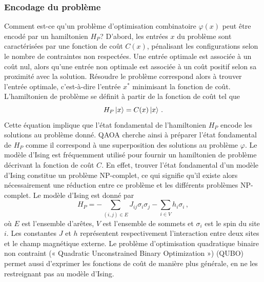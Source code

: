 
\subsubsection{Encodage du problème}
\label{subsec:encodage-probleme}

Comment est-ce qu'un problème d'optimisation combinatoire $\varphi(x)$ peut être encodé par un hamiltonien $H_{P}$? D'abord, les entrées $x$ du problème sont caractérisées par une fonction de coût $C(x)$, pénalisant les configurations selon le nombre de contraintes non respectées. Une entrée optimale est associée à un coût nul, alors qu'une entrée non optimale est associée à un coût positif selon sa proximité avec la solution. Résoudre le problème correspond alors à trouver l'entrée optimale, c'est-à-dire l'entrée $x^{*}$ minimisant la fonction de coût. L'hamiltonien de problème se définit à partir de la fonction de coût tel que
\begin{equation}
    H_{P} \ket{x} = C(x) \ket{x} \,.
\end{equation}
Cette équation implique que l'état fondamental de l'hamiltonien $H_{P}$ encode les solutions au problème donné. QAOA cherche ainsi à préparer l'état fondamental de $H_{P}$ comme il correspond à une superposition des solutions au problème $\varphi$. Le modèle d'Ising est fréquemment utilisé pour fournir un hamiltonien de problème décrivant la fonction de coût $C$. En effet, trouver l'état fondamental d'un modèle d'Ising constitue un problème \textsf{NP}-complet, ce qui signifie qu'il existe alors nécessairement une réduction entre ce problème et les différents problèmes \textsf{NP}-complet. Le modèle d'Ising est donné par
\begin{equation}
    \label{eq:hamiltonien-ising}
    H_P = - \sum_{(i,j) \in E} J_{ij} \sigma_i \sigma_j - \sum_{i \in V} h_i \sigma_i \,,
\end{equation}
où $E$ est l'ensemble d'arêtes, $V$ est l'ensemble de sommets et $\sigma_{i}$ est le spin du site $i$. Les constantes $J$ et $h$ représentent respectivement l'interaction entre deux sites et le champ magnétique externe. Le problème d'optimisation quadratique binaire non contraint (« Quadratic Unconstrained Binary Optimization ») (QUBO) permet aussi d'exprimer les fonctions de coût de manière plus générale, en ne les restreignant pas au modèle d'Ising.

